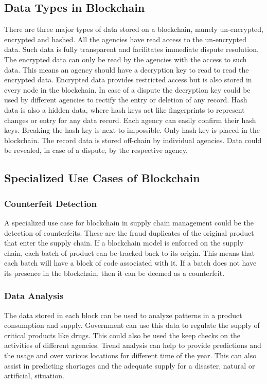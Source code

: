 \documentclass[sigconf]{acmart}
\begin{document}
\subsection{Data Types in Blockchain}
There are three major types of data stored on a blockchain, namely un-encrypted, encrypted and hashed\cite{arbc1}. All the agencies have read access to the un-encrypted data. Such data is fully transparent and facilitates immediate dispute resolution. The encrypted data can only be read by the agencies with the access to such data. This means an agency should have a decryption key to read to read the encrypted data. Encrypted data provides restricted access but is also stored in every node in the blockchain. In case of a dispute the decryption key could be used by different agencies to rectify the entry or deletion of any record. Hash data is also a hidden data, where hash keys act like fingerprints to represent changes or entry for any data record. Each agency can easily confirm their hash keys. Breaking the hash key is next to impossible. Only hash key is placed in the blockchain. The record data is stored off-chain by individual agencies. Data could be revealed, in case of a dispute, by the respective agency\cite{arbc1}.

\subsection{Specialized Use Cases of Blockchain}
\subsubsection{Counterfeit Detection}
A specialized use case for blockchain in supply chain management could be the detection of counterfeits. These are the fraud duplicates of the original product that enter the supply chain. If a blockchain model is enforced on the supply chain, each batch of product can be tracked back to its origin. This means that each batch will have a block of code associated with it. If a batch does not have its presence in the blockchain, then it can be deemed as a counterfeit.  

\subsubsection{Data Analysis}
The data stored in each block can be used to analyze patterns in a product consumption and supply. Government can use this data to regulate the supply of critical products like drugs. This could also be used the keep checks on the activities of different agencies. Trend analysis can help to provide predictions and the usage and over various locations for different time of the year. This can also assist in predicting shortages and the adequate supply for a disaster, natural or artificial, situation. 
\end{document}
